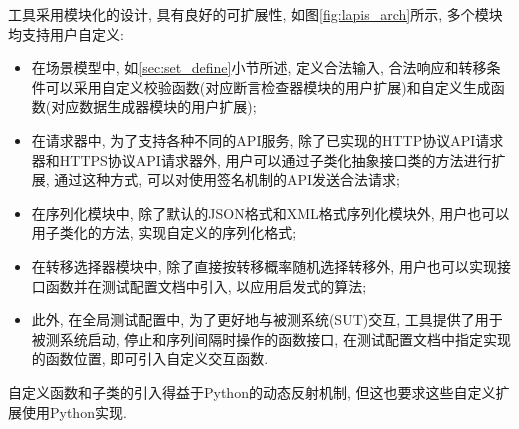 	    工具采用模块化的设计, 具有良好的可扩展性, 如图\ref{fig:lapis_arch}所示, 多个模块均支持用户自定义:
	    \begin{itemize}
	        \item 在场景模型中, 如\ref{sec:set_define}小节所述, 定义合法输入, 合法响应和转移条件可以采用自定义校验函数(对应断言检查器模块的用户扩展)和自定义生成函数(对应数据生成器模块的用户扩展);
	        \item 在请求器中, 为了支持各种不同的API服务, 除了已实现的HTTP协议API请求器和HTTPS协议API请求器外, 用户可以通过子类化抽象接口类的方法进行扩展, 通过这种方式, 可以对使用签名机制的API发送合法请求;
	        \item 在序列化模块中, 除了默认的JSON格式和XML格式序列化模块外, 用户也可以用子类化的方法, 实现自定义的序列化格式;
	        \item 在转移选择器模块中, 除了直接按转移概率随机选择转移外, 用户也可以实现接口函数并在测试配置文档中引入, 以应用启发式的算法;
	        \item 此外, 在全局测试配置中, 为了更好地与被测系统(SUT)交互, 工具提供了用于被测系统启动, 停止和序列间隔时操作的函数接口, 在测试配置文档中指定实现的函数位置, 即可引入自定义交互函数.
	    \end{itemize}  
	    自定义函数和子类的引入得益于Python的动态反射机制, 但这也要求这些自定义扩展使用Python实现.
	    
